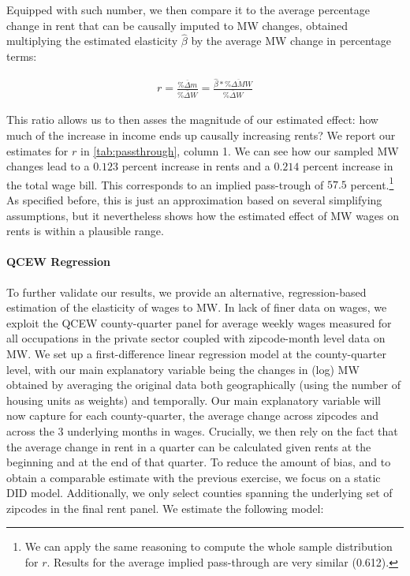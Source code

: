 Equipped with such number, we then compare it to the average percentage change in rent that 
can be causally imputed to MW changes, obtained multiplying the estimated elasticity $\hat{\beta}$ 
by the average MW change in percentage terms: 

\begin{align}
	r = \frac{\overline{\% \Delta m}}{\overline{\% \Delta W}} = \frac{\hat{\beta}*\overline{\% \Delta MW}}{\overline{\% \Delta W}} 
\end{align}

This ratio allows us to then asses the magnitude of our estimated effect: how much of the 
increase in income ends up causally increasing rents? We report our estimates for $r$ in 
\autoref{tab:passthrough}, column 1. We can see how our sampled MW changes lead to a $0.123$ 
percent increase in rents and a $0.214$ percent increase in the total wage bill. This corresponds 
to an implied pass-trough of $57.5$ percent.\footnote{We can apply the same reasoning to compute 
	the whole sample distribution for $r$. Results for the average implied pass-through are very similar (0.612).}
As specified before, this is just an approximation based on several simplifying assumptions, but it 
nevertheless shows how the estimated effect of MW wages on rents is within a plausible range. 

\paragraph{QCEW Regression} To further validate our results, we provide an alternative, 
regression-based estimation of the elasticity of wages to MW. In lack of finer data on wages, 
we exploit the QCEW county-quarter panel for average weekly wages measured for all occupations 
in the private sector coupled with zipcode-month level data on MW. We set up a first-difference 
linear regression model at the county-quarter level, with our main explanatory variable being the 
changes in (log) MW obtained by averaging the original data both geographically (using the 
number of housing units as weights) and temporally. Our main explanatory variable will now capture 
for each county-quarter, the average change across zipcodes and across the 3 underlying months 
in wages. Crucially, we then rely on the fact that the average change in rent in a quarter can be calculated 
given rents at the beginning and at the end of that quarter. To reduce the amount of bias, and to obtain 
a comparable estimate with the previous exercise, we focus on a static DID model. Additionally, we only 
select counties spanning the underlying set of zipcodes in the final rent panel. We estimate the following model: 


